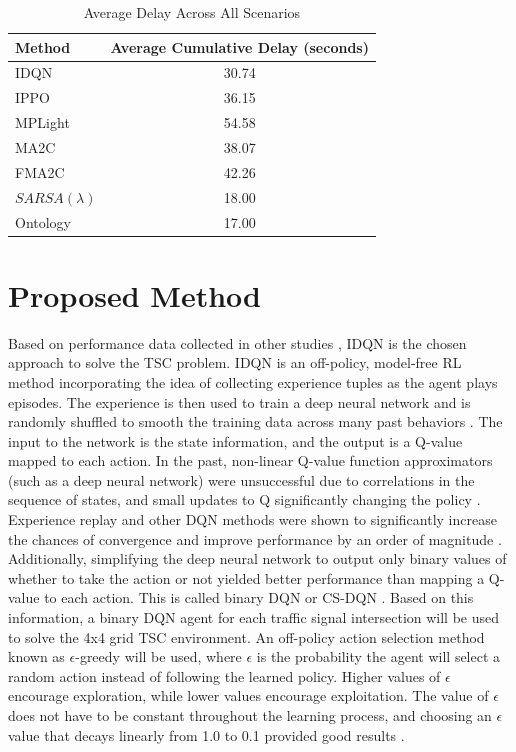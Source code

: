 \documentclass[letterpaper]{article} %
\begin{document}
\begin{table}[H]
\centering
\begin{tabular}{lc}
\hline
\textbf{Method} & \textbf{Average Cumulative Delay (seconds)} \\ \hline
IDQN            & 30.74                  \\
IPPO            & 36.15                  \\
MPLight         & 54.58                  \\
MA2C            & 38.07\footnotemark[1]                  \\
FMA2C           & 42.26                  \\
\(SARSA(\lambda)\)           & 18.00\footnotemark[2]                  \\
Ontology        & 17.00\footnotemark[2]                  \\ \hline
\end{tabular}
\caption{Average Delay Across All Scenarios}
\label{tab:avg_delay}
\end{table}

\section{Proposed Method}
Based on performance data collected in other studies \cite{ault2021reinforcement} \cite{Ghanadbashi2023},
IDQN is the chosen approach to solve the TSC problem.
IDQN is an off-policy, model-free RL method incorporating the idea of collecting experience tuples as the agent plays episodes.
The experience is then used to train a deep neural network and is randomly shuffled to smooth the training data across many past behaviors \cite{DBLP:journals/corr/MnihKSGAWR13}.
The input to the network is the state information, and the output is a Q-value mapped to each action.
In the past, non-linear Q-value function approximators (such as a deep neural network) were unsuccessful due to correlations in the sequence of states, and small updates to Q significantly changing the policy \cite{hafiz2020deep}.
Experience replay and other DQN methods were shown to significantly increase the chances of convergence and improve performance by an order of magnitude \cite{Mnih2015}.
Additionally, simplifying the deep neural network to output only binary values of whether to take the action or not yielded better performance than mapping a Q-value to each action. This is called binary DQN or CS-DQN \cite{hafiz2020deep}.
Based on this information, a binary DQN agent for each traffic signal intersection will be used to solve the 4x4 grid TSC environment.
An off-policy action selection method known as $\epsilon$-greedy will be used, where $\epsilon$ is the probability the agent will select a random action instead of following the learned policy.
Higher values of $\epsilon$ encourage exploration, while lower values encourage exploitation.
The value of $\epsilon$ does not have to be constant throughout the learning process, and choosing an $\epsilon$ value that decays linearly from 1.0 to 0.1 provided good results \cite{Mnih2015}.
\end{document}
